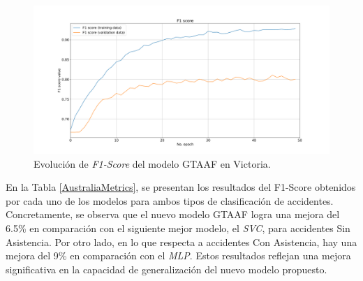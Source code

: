 \begin{figure}[h!]
	\centering
	\includegraphics[width=160mm]{Figures/Victoria/Victoria_convolution_2d_f1_score_paper.png}
	\caption{Evolución de \textit{F1-Score} del modelo GTAAF en Victoria.}
	\label{VictoriaLossFunction}
\end{figure}

En la Tabla \ref{AustraliaMetrics}, se presentan los resultados del F1-Score obtenidos por cada uno de los modelos para ambos tipos de clasificación de accidentes. Concretamente, se observa que el nuevo modelo GTAAF logra una mejora del 6.5\% en comparación con el siguiente mejor modelo, el \textit{SVC}, para accidentes Sin Asistencia. Por otro lado, en lo que respecta a accidentes Con Asistencia, hay una mejora del 9\% en comparación con el \textit{MLP}. Estos resultados reflejan una mejora significativa en la capacidad de generalización del nuevo modelo propuesto.


